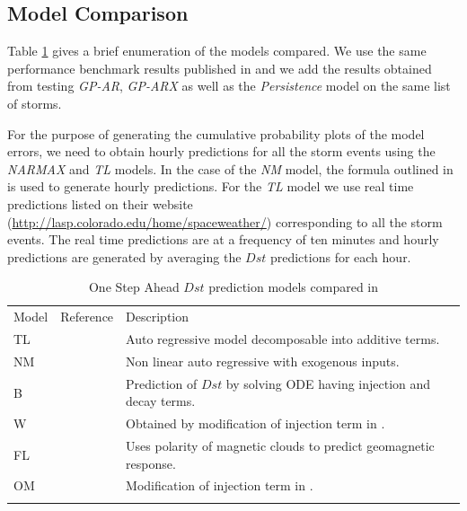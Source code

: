 \documentclass[referee,a4paper,12pt,traditabstract]{swsc}
\begin{document}
\begin{linenumbers}
\subsection{Model Comparison}

Table \ref{table:DstModels} gives a brief enumeration of the models compared. We use the same performance benchmark results published in \citet{Ji2012} and we add the results obtained from testing \emph{GP-AR}, \emph{GP-ARX} as well as the \emph{Persistence} model on the same list of storms. 

For the purpose of generating the cumulative probability plots of the model errors, we need to obtain hourly predictions for all the storm events using the \emph{NARMAX} and \emph{TL} models. In the case of the \emph{NM} model, the formula outlined in \citet{balikhin:narmax} is used to generate hourly predictions. For the \emph{TL} model we use real time predictions listed on their website (\url{http://lasp.colorado.edu/home/spaceweather/}) corresponding to all the storm events. The real time predictions are at a frequency of ten minutes and hourly predictions are generated by averaging the $Dst$ predictions for each hour.

\begin{table}
      \caption[]{One Step Ahead $Dst$ prediction models compared in \citet{Ji2012}}
         \label{table:DstModels}
      
         \begin{tabular}{lll}
            \hline
            \noalign{\smallskip}
            Model  &  Reference  &  Description \\
            \noalign{\smallskip}
            \hline
            \noalign{\smallskip}
            TL & \citet{JGRA:JGRA16300} & Auto regressive model decomposable into additive terms.      \\
            NM & \citet{balikhin:narmax} & Non linear auto regressive with exogenous inputs. \\
            B & \citet{JGR:JGR10260} & Prediction of $Dst$ by solving ODE having injection and decay terms. \\
            W & \citet{Wang:Dst} & Obtained by modification of injection term in \citet{JGR:JGR10260}. \\
            FL & \citet{GRL:GRL11549} & Uses polarity of magnetic clouds to predict geomagnetic response.\\
            OM & \citet{JGRA:JGRA14856} & Modification of injection term in \citet{JGR:JGR10260}.\\
            \noalign{\smallskip}
            \hline
         \end{tabular}
\end{table}


\end{linenumbers}
\end{document}
